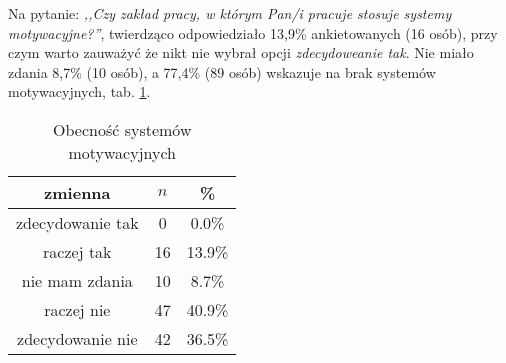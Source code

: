 
Na pytanie: \textit{,,Czy zakład pracy, w którym Pan/i pracuje stosuje systemy motywacyjne?''}, twierdząco odpowiedziało 13,9\% ankietowanych (16 osób), przy czym warto zauważyć że nikt nie wybrał opcji \textit{zdecydoweanie tak}. Nie miało zdania 8,7\% (10 osób), a 77,4\% (89 osób) wskazuje na brak systemów motywacyjnych, tab. \ref{tab:Q9}.


\begin{table}[H]
\caption{Obecność systemów motywacyjnych}
\centering
\begin{tabular}{ | c | c | c |}
\hline
zmienna & $n$ & \% \\
\hline
zdecydowanie tak  &  0  & 0.0\% \\
\hline
raczej tak  &  16  & 13.9\% \\
\hline
nie mam zdania  &  10  & 8.7\% \\
\hline
raczej nie  &  47  & 40.9\% \\
\hline
zdecydowanie nie  &  42  & 36.5\% \\
\hline
\end{tabular}
\label{tab:Q9}
\end{table}

